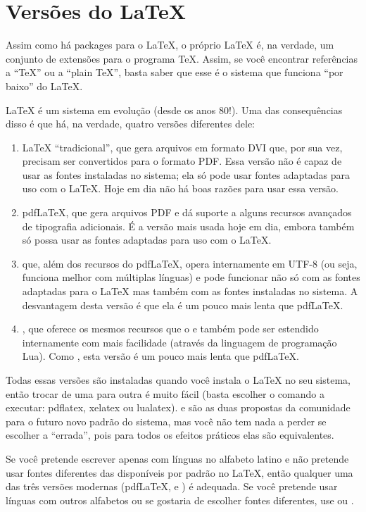 \section{Versões do \LaTeX{}}

Assim como há packages para o \LaTeX{}, o próprio \LaTeX{} é, na verdade, um
conjunto de extensões para o programa \TeX{}. Assim, se você encontrar
referências a ``\TeX{}'' ou a ``plain \TeX{}'', basta saber que esse é o
sistema que funciona ``por baixo'' do \LaTeX{}.

\LaTeX{} é um sistema em evolução (desde os anos 80!). Uma das consequências
disso é que há, na verdade, quatro versões diferentes dele:

\begin{enumerate}
\item \LaTeX{} ``tradicional'', que gera arquivos em formato DVI que, por
sua vez, precisam ser convertidos para o formato PDF. Essa versão não é
capaz de usar as fontes instaladas no sistema; ela só pode usar fontes
adaptadas para uso com o \LaTeX{}. Hoje em dia não há boas razões para
usar essa versão.

\item pdf\LaTeX{}, que gera arquivos PDF e dá suporte a alguns recursos
avançados de tipografia adicionais. É a versão mais usada hoje em dia,
embora também só possa usar as fontes adaptadas para uso com o \LaTeX{}.

\item \XeLaTeX{} que, além dos recursos do pdf\LaTeX{}, opera internamente
em UTF-8 (ou seja, funciona melhor com múltiplas línguas) e pode funcionar
não só com as fontes adaptadas para o \LaTeX{} mas também com as fontes
instaladas no sistema. A desvantagem desta versão é que ela é um pouco
mais lenta que pdf\LaTeX{}.

\item \LuaLaTeX{}, que oferece os mesmos recursos que o \XeLaTeX{} e
também pode ser estendido internamente com mais facilidade (através da
linguagem de programação Lua). Como \XeLaTeX{}, esta versão é um pouco
mais lenta que pdf\LaTeX{}.
\end{enumerate}

Todas essas versões são instaladas quando você instala o \LaTeX{} no seu
sistema, então trocar de uma para outra é muito fácil (basta escolher o
comando a executar: pdflatex, xelatex ou lualatex). \XeLaTeX{} e
\LuaLaTeX{} são as duas propostas da comunidade para o futuro novo padrão
do sistema, mas você não tem nada a perder se escolher a ``errada'', pois
para todos os efeitos práticos elas são equivalentes.

Se você pretende escrever apenas com línguas no alfabeto latino e não
pretende usar fontes diferentes das disponíveis por padrão no \LaTeX{},
então qualquer uma das três versões modernas (pdf\LaTeX{}, \XeLaTeX{}
e \LuaLaTeX{}) é adequada. Se você pretende usar línguas com outros
alfabetos ou se gostaria de escolher fontes diferentes, use \XeLaTeX{}
ou \LuaLaTeX{}.
